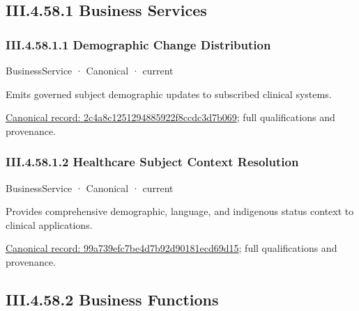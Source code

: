 \subsection*{III.4.58.1 Business Services}
\label{navigation:III.4.58.1}

\subsubsection*{III.4.58.1.1 Demographic Change Distribution}
\label{navigation:III.4.58.1.1}

\label{element:2c4a8c1251294885922f8ccdc3d7b069}
{\small BusinessService · Canonical · current}\par

Emits governed subject demographic updates to subscribed clinical systems.


{\footnotesize \href{../../../../continuum/business/business-service/2c4a8c1251294885922f8ccdc3d7b069.md}{Canonical record: 2c4a8c1251294885922f8ccdc3d7b069}; full qualifications and provenance.}\par
\subsubsection*{III.4.58.1.2 Healthcare Subject Context Resolution}
\label{navigation:III.4.58.1.2}

\label{element:99a739efc7be4d7b92d90181ecd69d15}
{\small BusinessService · Canonical · current}\par

Provides comprehensive demographic, language, and indigenous status context to clinical applications.


{\footnotesize \href{../../../../continuum/business/business-service/99a739efc7be4d7b92d90181ecd69d15.md}{Canonical record: 99a739efc7be4d7b92d90181ecd69d15}; full qualifications and provenance.}\par
\subsection*{III.4.58.2 Business Functions}
\label{navigation:III.4.58.2}

